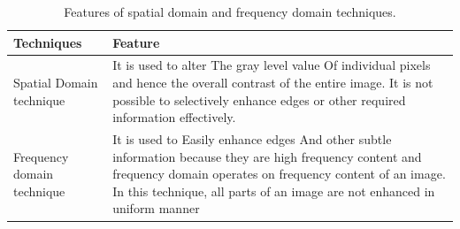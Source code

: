 \begin{table}[h!]
	\begin{center}
	\caption{Features of spatial domain and frequency domain techniques.}
    \label{tab:table1}
	\begin{tabular}{| m{5cm} | m{8cm}| }
	\hline
		\textbf{Techniques} & \textbf{Feature}\\
	\hline
		Spatial Domain technique & It is used to alter The gray level value Of individual pixels and hence the overall contrast of the entire image. It is not possible to selectively enhance edges or other required information effectively. \\
	\hline
		Frequency domain technique & It is used to Easily enhance edges And other subtle information because they are high frequency content and frequency domain operates on frequency content of an image. In this technique, all parts of  an  image  are  not enhanced in uniform manner \\ 
	
	\hline
	\end{tabular}
	\end{center}

\end{table}



